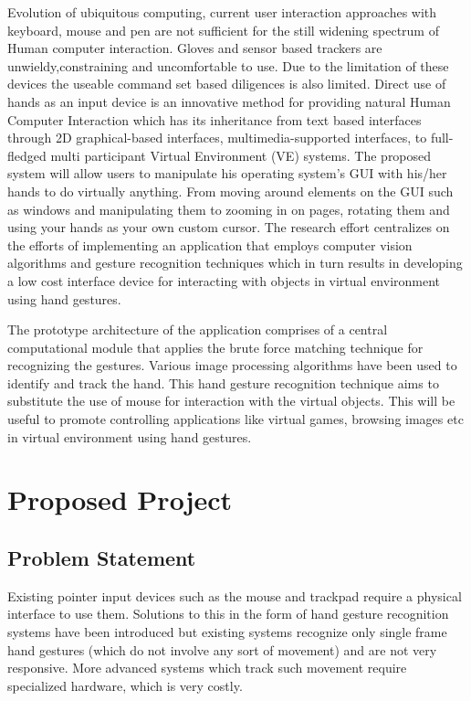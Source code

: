 \documentclass[11pt]{report}
\begin{document}
Evolution of ubiquitous computing, current user interaction approaches with keyboard, mouse and pen are not sufficient for the still widening spectrum of Human computer interaction. Gloves and sensor based trackers are unwieldy,constraining and uncomfortable to use. Due to the limitation of these devices the useable command set based diligences is also limited. Direct use of hands as an input device is an innovative method for providing natural Human Computer Interaction which has its inheritance from text based interfaces through 2D graphical-based interfaces, multimedia-supported interfaces, to full-fledged multi participant Virtual Environment (VE) systems. The proposed system will allow users to manipulate his operating system’s GUI with his/her hands to do virtually anything. From moving around elements on the GUI such as windows and manipulating them to zooming in on pages, rotating them and using your hands as your own custom cursor. The research effort centralizes on the efforts of implementing an application that employs computer vision algorithms and gesture recognition techniques which in turn results in developing a low cost interface device for interacting with objects in virtual environment using hand gestures.

The prototype architecture of the application comprises of a central computational module that applies the brute force matching technique for recognizing the gestures. Various image processing algorithms have been used to identify and track the hand. This hand gesture recognition technique aims to substitute the use of mouse for interaction with the virtual objects. This will be useful to promote controlling applications like virtual games, browsing images etc in virtual environment using hand gestures.

\section{Proposed Project}

\subsection{Problem Statement}

Existing pointer input devices such as the mouse and trackpad require a physical interface to use them. Solutions to this in the form of hand gesture recognition systems have been introduced but existing systems recognize only single frame hand gestures (which do not involve any sort of movement) and are not very responsive. More advanced systems which track such movement require specialized hardware, which is very costly.
\end{document}
